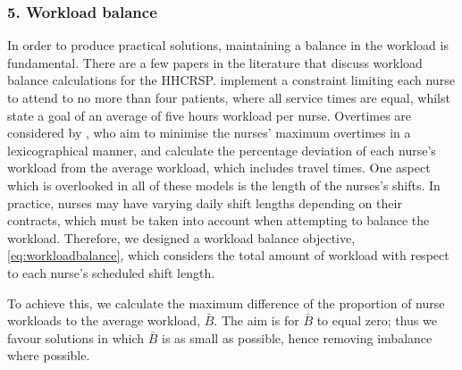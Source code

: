 \documentclass[a4paper,11pt,authoryear]{elsarticle}
\begin{document}


\subsubsection*{5. Workload balance}
\noindent In order to produce practical solutions, maintaining a balance in the workload is fundamental. There are a few papers in the literature that discuss workload balance calculations for the HHCRSP. \citet{bowers2015} implement a constraint limiting each nurse to attend to no more than four patients, where all service times are equal, whilst \citet{bredstrom2008} state a goal of an average of five hours workload per nurse. Overtimes are considered by \citet{lanzarone2014}, who aim to minimise the nurses' maximum overtimes in a lexicographical manner, and \citet{mutingi2014} calculate the percentage deviation of each nurse's workload from the average workload, which includes travel times. One aspect which is overlooked in all of these models is the length of the nurses's shifts. In practice, nurses may have varying daily shift lengths depending on their contracts, which must be taken into account when attempting to balance the workload. Therefore, we designed a workload balance objective, \eqref{eq:workloadbalance}, which considers the total amount of workload with respect to each nurse's scheduled shift length. 

To achieve this, we calculate the maximum difference of the proportion of nurse workloads to the average workload, $\bar{B}$. The aim is for $\bar{B}$ to equal zero; thus we favour solutions in which $\bar{B}$ is as small as possible, hence removing imbalance where possible.
\end{document}
